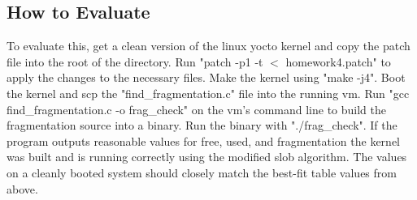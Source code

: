 \subsection{How to Evaluate}
To evaluate this, get a clean version of the linux yocto kernel and copy the patch file into the root of the directory. Run "patch -p1 -t $<$ homework4.patch" to apply the changes to the necessary files. Make the kernel using "make -j4". Boot the kernel and scp the "find\_fragmentation.c" file into the running vm. Run "gcc find\_fragmentation.c -o frag\_check" on the vm's command line to build the fragmentation source into a binary. Run the binary with "./frag\_check". If the program outputs reasonable values for free, used, and fragmentation the kernel was built and is running correctly using the modified slob algorithm. The values on a cleanly booted system should closely match the best-fit table values from above. 
